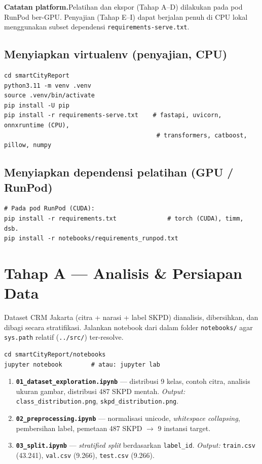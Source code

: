 \documentclass[11pt,a4paper]{article}
\newcommand{\code}[1]{\texttt{\small #1}}
\newcommand{\stage}[2]{%
  \par\medskip\noindent\colorbox{stagebg}{\parbox{\dimexpr\linewidth-2\fboxsep}{%
  \textbf{\color{accent}#1}\;\;#2}}\par\smallskip}
\begin{document}
\stage{Catatan platform.}{Pelatihan dan ekspor (Tahap A--D) dilakukan pada pod RunPod ber-GPU. Penyajian (Tahap E--I) dapat berjalan penuh di CPU lokal menggunakan subset dependensi \code{requirements-serve.txt}.}

\subsection{Menyiapkan virtualenv (penyajian, CPU)}
\begin{lstlisting}
cd smartCityReport
python3.11 -m venv .venv
source .venv/bin/activate
pip install -U pip
pip install -r requirements-serve.txt    # fastapi, uvicorn, onnxruntime (CPU),
                                          # transformers, catboost, pillow, numpy
\end{lstlisting}

\subsection{Menyiapkan dependensi pelatihan (GPU / RunPod)}
\begin{lstlisting}
# Pada pod RunPod (CUDA):
pip install -r requirements.txt              # torch (CUDA), timm, dsb.
pip install -r notebooks/requirements_runpod.txt
\end{lstlisting}

\section{Tahap A — Analisis \& Persiapan Data}
Dataset CRM Jakarta (citra + narasi + label SKPD) dianalisis, dibersihkan, dan
dibagi secara stratifikasi. Jalankan notebook dari dalam folder \code{notebooks/}
agar \code{sys.path} relatif (\code{../src/}) ter-resolve.

\begin{lstlisting}
cd smartCityReport/notebooks
jupyter notebook        # atau: jupyter lab
\end{lstlisting}

\begin{enumerate}[leftmargin=1.6em,itemsep=3pt]
  \item \textbf{\code{01\_dataset\_exploration.ipynb}} — distribusi 9 kelas,
        contoh citra, analisis ukuran gambar, distribusi 487 SKPD mentah.
        \emph{Output:} \code{class\_distribution.png}, \code{skpd\_distribution.png}.
  \item \textbf{\code{02\_preprocessing.ipynb}} — normalisasi unicode,
        \emph{whitespace collapsing}, pembersihan label, pemetaan 487 SKPD
        $\rightarrow$ 9 instansi target.
  \item \textbf{\code{03\_split.ipynb}} — \emph{stratified split} berdasarkan
        \code{label\_id}. \emph{Output:} \code{train.csv} (43.241),
        \code{val.csv} (9.266), \code{test.csv} (9.266).
\end{enumerate}
\end{document}

